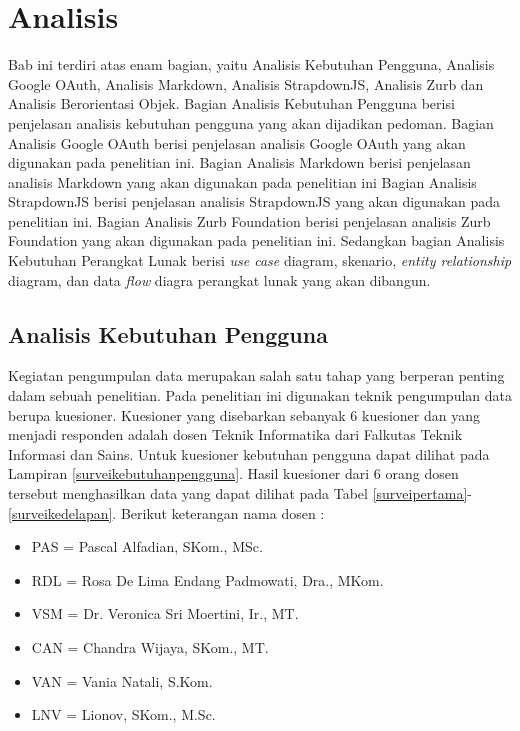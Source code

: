 \chapter{Analisis}
\label{chap:analisis}

Bab ini terdiri atas enam bagian, yaitu Analisis Kebutuhan Pengguna, Analisis Google OAuth, Analisis Markdown, Analisis StrapdownJS, Analisis Zurb dan Analisis Berorientasi Objek. Bagian Analisis Kebutuhan Pengguna berisi penjelasan analisis kebutuhan pengguna yang akan dijadikan pedoman. Bagian Analisis Google OAuth berisi penjelasan analisis Google OAuth yang akan digunakan pada penelitian ini. Bagian Analisis Markdown berisi penjelasan analisis Markdown yang akan digunakan pada penelitian ini Bagian Analisis StrapdownJS berisi penjelasan analisis StrapdownJS yang akan digunakan pada penelitian ini. Bagian Analisis Zurb Foundation berisi penjelasan analisis Zurb Foundation yang akan digunakan pada penelitian ini. Sedangkan bagian Analisis Kebutuhan Perangkat Lunak berisi {\it use case} diagram, skenario, {\it entity relationship} diagram, dan data {\it flow} diagra perangkat lunak yang akan dibangun.

\section{Analisis Kebutuhan Pengguna}
\label{sec:analisiskebutuhanpengguna}
Kegiatan pengumpulan data merupakan salah satu tahap yang berperan penting dalam sebuah penelitian. Pada penelitian ini digunakan teknik pengumpulan data berupa kuesioner. Kuesioner yang disebarkan sebanyak 6 kuesioner dan yang menjadi responden adalah dosen Teknik Informatika dari Falkutas Teknik Informasi dan Sains. Untuk kuesioner kebutuhan pengguna dapat dilihat pada Lampiran \ref{surveikebutuhanpengguna}. Hasil kuesioner dari 6 orang dosen tersebut menghasilkan data yang dapat dilihat pada Tabel \ref{surveipertama}-\ref{surveikedelapan}. Berikut keterangan nama dosen :
\begin{itemize}
\item PAS = Pascal Alfadian, SKom., MSc.
\item RDL = Rosa De Lima Endang Padmowati, Dra., MKom.
\item VSM = Dr. Veronica Sri Moertini, Ir., MT.
\item CAN = Chandra Wijaya, SKom., MT.
\item VAN = Vania Natali, S.Kom.
\item LNV = Lionov, SKom., M.Sc.
\end{itemize}

